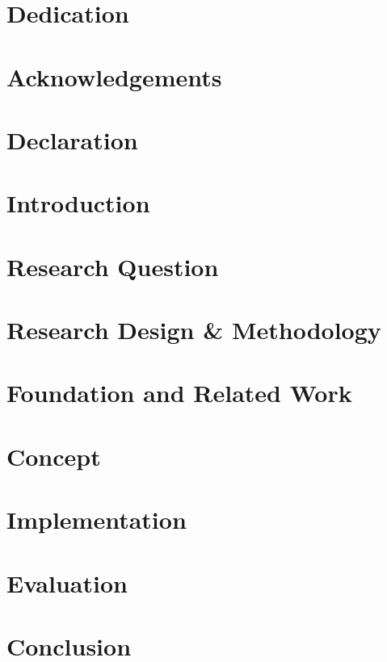 \documentclass[a4paper,12pt]{report}
\begin{document}



\chapter*{Dedication}

\chapter*{Acknowledgements}

\chapter*{Declaration}


\tableofcontents
\listoffigures
\listoftables

\chapter{Introduction}

\chapter{Research Question}

\chapter{Research Design \& Methodology}

\chapter{Foundation and Related Work}

\chapter{Concept}

\chapter{Implementation}

\chapter{Evaluation}

\chapter{Conclusion}

\end{document}

